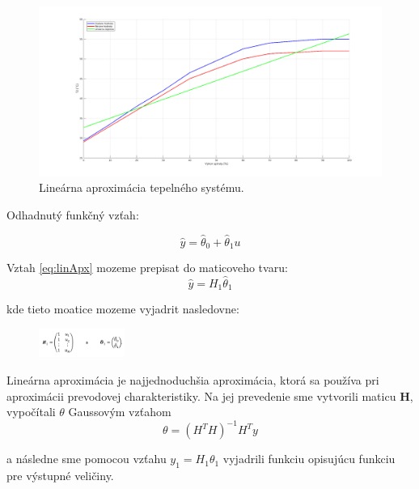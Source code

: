 \documentclass{article}
\begin{document}
\begin{figure}[!htbp]
	\begin{center}
		\includegraphics[width=\textwidth]{include/linearna_regresia.png}
	\end{center}
	\caption{Lineárna aproximácia tepelného systému.}
	\label{fig:linApx}
\end{figure}

Odhadnutý funkčný vzťah:

\begin{equation}
	\hat{y} = \hat{\theta}_0 + \hat{\theta}_1u
	\label{eq:linApx}
\end{equation}

Vztah \ref{eq:linApx} mozeme prepisat do maticoveho tvaru:
\begin{equation}
	\hat{y} = H_1\hat{\theta}_1
	\label{eq:linApx2}
\end{equation}

kde tieto moatice mozeme vyjadrit nasledovne:

\begin{figure}[!htbp]
	\begin{center}
		\includegraphics[width=0.25\textwidth]{include/defHandTheta.png}
	\end{center}
\end{figure}

Lineárna aproximácia je najjednoduchšia aproximácia, ktorá sa používa pri aproximácii prevodovej
charakteristiky. Na jej prevedenie sme vytvorili maticu \textbf{H}, vypočítali
\(\theta\) Gaussovým vzťahom
\begin{equation}
	\theta = (H^TH)^{-1}H^Ty
	\label{eq:gausEq}
\end{equation}

a následne sme pomocou vzťahu \(y_1 = H_1\theta_1\) vyjadrili funkciu opisujúcu funkciu pre výstupné
veličiny.
\end{document}
